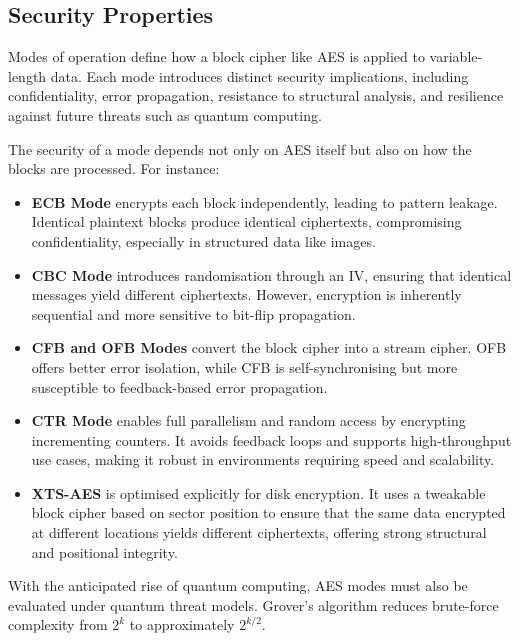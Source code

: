 \subsection{Security Properties}

Modes of operation define how a block cipher like AES is applied to variable-length data. 
Each mode introduces distinct security implications, 
including confidentiality, error propagation, resistance to structural analysis, 
and resilience against future threats such as quantum computing.

\noindent The security of a mode depends not only on AES itself but also on how the blocks are processed. 
For instance:

\begin{itemize}
    \item \textbf{\Gls{ECB} Mode} encrypts each block independently, leading to pattern leakage. Identical plaintext blocks produce identical ciphertexts, compromising confidentiality, especially in structured data like images.
    
    \item \textbf{\Gls{CBC} Mode} introduces randomisation through an \Gls{IV}, ensuring that identical messages yield different ciphertexts. However, encryption is inherently sequential and more sensitive to bit-flip propagation.
    
    \item \textbf{\Gls{CFB} and \Gls{OFB} Modes} convert the block cipher into a stream cipher. OFB offers better error isolation, while CFB is self-synchronising but more susceptible to feedback-based error propagation.
    
    \item \textbf{\Gls{CTR} Mode} enables full parallelism and random access by encrypting incrementing counters. It avoids feedback loops and supports high-throughput use cases, making it robust in environments requiring speed and scalability.
    
    \item \textbf{\Gls{XTS}-AES} is optimised explicitly for disk encryption. It uses a tweakable block cipher based on sector position to ensure that the same data encrypted at different locations yields different ciphertexts, offering strong structural and positional integrity.
\end{itemize}

With the anticipated rise of quantum computing, 
AES modes must also be evaluated under quantum threat models. 
Grover’s algorithm reduces brute-force complexity from $2^k$ to approximately $2^{k/2}$. \newline

